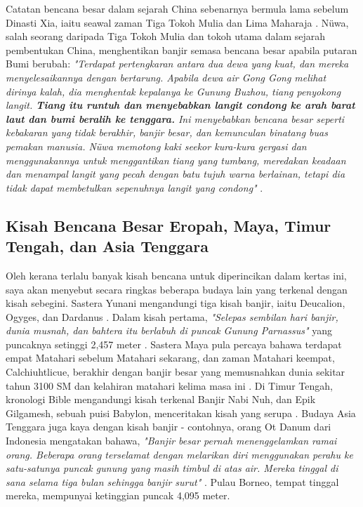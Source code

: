 \documentclass[10pt,twocolumn,letterpaper]{article}
\begin{document}
Catatan bencana besar dalam sejarah China sebenarnya bermula lama sebelum Dinasti Xia, iaitu seawal zaman Tiga Tokoh Mulia dan Lima Maharaja \cite{7}. Nüwa, salah seorang daripada Tiga Tokoh Mulia dan tokoh utama dalam sejarah pembentukan China, menghentikan banjir semasa bencana besar apabila putaran Bumi berubah: \textit{"Terdapat pertengkaran antara dua dewa yang kuat, dan mereka menyelesaikannya dengan bertarung. Apabila dewa air Gong Gong melihat dirinya kalah, dia menghentak kepalanya ke Gunung Buzhou, tiang penyokong langit. \textbf{Tiang itu runtuh dan menyebabkan langit condong ke arah barat laut dan bumi beralih ke tenggara.} Ini menyebabkan bencana besar seperti kebakaran yang tidak berakhir, banjir besar, dan kemunculan binatang buas pemakan manusia. Nüwa memotong kaki seekor kura-kura gergasi dan menggunakannya untuk menggantikan tiang yang tumbang, meredakan keadaan dan menampal langit yang pecah dengan batu tujuh warna berlainan, tetapi dia tidak dapat membetulkan sepenuhnya langit yang condong"} \cite{8}.

\subsection{Kisah Bencana Besar Eropah, Maya, Timur Tengah, dan Asia Tenggara}

Oleh kerana terlalu banyak kisah bencana untuk diperincikan dalam kertas ini, saya akan menyebut secara ringkas beberapa budaya lain yang terkenal dengan kisah sebegini. Sastera Yunani mengandungi tiga kisah banjir, iaitu Deucalion, Ogyges, dan Dardanus \cite{9,10}. Dalam kisah pertama, \textit{"Selepas sembilan hari banjir, dunia musnah, dan bahtera itu berlabuh di puncak Gunung Parnassus"} yang puncaknya setinggi 2,457 meter \cite{11}. Sastera Maya pula percaya bahawa terdapat empat Matahari sebelum Matahari sekarang, dan zaman Matahari keempat, Calchiuhtlicue, berakhir dengan banjir besar yang memusnahkan dunia sekitar tahun 3100 SM dan kelahiran matahari kelima masa ini \cite{12}. Di Timur Tengah, kronologi Bible mengandungi kisah terkenal Banjir Nabi Nuh, dan Epik Gilgamesh, sebuah puisi Babylon, menceritakan kisah yang serupa \cite{13}. Budaya Asia Tenggara juga kaya dengan kisah banjir - contohnya, orang Ot Danum dari Indonesia mengatakan bahawa, \textit{"Banjir besar pernah menenggelamkan ramai orang. Beberapa orang terselamat dengan melarikan diri menggunakan perahu ke satu-satunya puncak gunung yang masih timbul di atas air. Mereka tinggal di sana selama tiga bulan sehingga banjir surut"} \cite{3}. Pulau Borneo, tempat tinggal mereka, mempunyai ketinggian puncak 4,095 meter.
\end{document}
